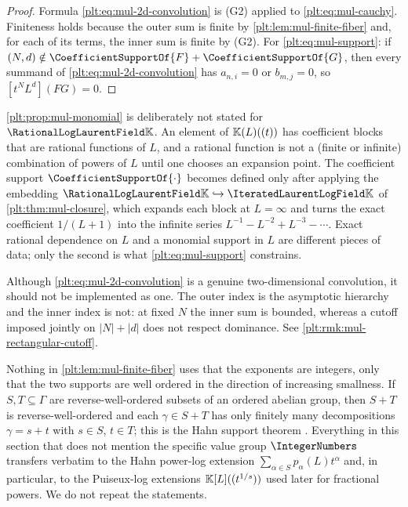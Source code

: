 \begin{proof}
Formula \eqref{plt:eq:mul-2d-convolution} is (G2) applied to
\eqref{plt:eq:mul-cauchy}.  Finiteness holds because the outer sum is finite
by \cref{plt:lem:mul-finite-fiber} and, for each of its terms, the inner sum
is finite by (G2).  For \eqref{plt:eq:mul-support}: if
$(N,d)\notin\CoefficientSupportOf{F}+\CoefficientSupportOf{G}$, then every
summand of \eqref{plt:eq:mul-2d-convolution} has $a_{n,i}=0$ or $b_{m,j}=0$,
so $[t^NL^d](FG)=0$.
\end{proof}

\begin{remark}
\label{plt:rmk:mul-rat-no-support}
\cref{plt:prop:mul-monomial} is deliberately not stated for $\PLrat$.  An
element of $\mathbb{K}(L)((t))$ has coefficient blocks that are rational functions of
$L$, and a rational function is not a (finite or infinite) combination of
powers of $L$ until one chooses an expansion point.  The coefficient support
$\CoefficientSupportOf{\cdot}$ becomes defined only after applying the
embedding $\PLrat\hookrightarrow\PLit$ of \cref{plt:thm:mul-closure}, which
expands each block at $L=\infty$ and turns the exact coefficient $1/(L+1)$
into the infinite series $L^{-1}-L^{-2}+L^{-3}-\cdots$.  Exact rational
dependence on $L$ and a monomial support in $L$ are different pieces of data;
only the second is what \eqref{plt:eq:mul-support} constrains.
\end{remark}

\begin{remark}
\label{plt:rmk:mul-two-level}
Although \eqref{plt:eq:mul-2d-convolution} is a genuine two-dimensional
convolution, it should not be implemented as one.  The outer index is the
asymptotic hierarchy and the inner index is not: at fixed $N$ the inner sum
is bounded, whereas a cutoff imposed jointly on $|N|+|d|$ does not respect
dominance.  See \cref{plt:rmk:mul-rectangular-cutoff}.
\end{remark}

\begin{remark}
\label{plt:rmk:mul-hahn}
Nothing in \cref{plt:lem:mul-finite-fiber} uses that the exponents are
integers, only that the two supports are well ordered in the direction of
increasing smallness.  If $S,T\subseteq\Gamma$ are reverse-well-ordered
subsets of an ordered abelian group, then $S+T$ is reverse-well-ordered and
each $\gamma\in S+T$ has only finitely many decompositions $\gamma=s+t$ with
$s\in S$, $t\in T$; this is the Hahn support theorem
\cite{hahn,edgar-beginners}.  Everything in this section that does not
mention the specific value group $\IntegerNumbers$ transfers verbatim to the
Hahn power-log extension $\sum_{\alpha\in S}p_\alpha(L)t^\alpha$ and, in
particular, to the Puiseux-log extensions $\mathbb{K}[L]((t^{1/s}))$ used later for
fractional powers.  We do not repeat the statements.
\end{remark}

